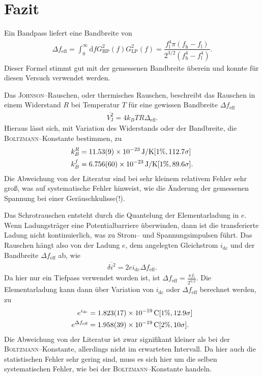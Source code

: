 \documentclass[sn-mathphys-num,iicol]{sn-jnl}
\theoremstyle{thmstyleone}
\theoremstyle{thmstyletwo}
\theoremstyle{thmstylethree}
\newcommand{\td}{\text{d}}
\begin{document}
\section{Fazit}
Ein Bandpass liefert eine Bandbreite von
\begin{align} 
  \Delta f_\text{eff}=\int_{0}^{\infty}\td fG_\text{HP}^2(f)G_\text{LP}^2(f)=\dfrac{f_\text{l}^4\pi \left(f_\text{h}-f_\text{l}\right)}{2^{3/2}\left(f_\text{h}^4-f_\text{l}^4\right)}
.\end{align}
Dieser Formel stimmt gut mit der gemessenen Bandbreite überein und konnte für diesen Versuch verwendet werden.

Das \textsc{Johnson}--Rauschen, oder thermisches Rauschen, beschreibt das Rauschen in einem Widerstand $R$ bei Temperatur $T$ für eine gewissen Bandbreite $\Delta f_\text{eff}$
\begin{align} 
  \overline{V_\text{J}^2}=4k_BTR\Delta _\text{eff}
.\end{align} 
Hieraus lässt sich, mit Variation des Widerstands oder der Bandbreite, die \textsc{Boltzmann}--Konstante bestimmen, zu
\begin{align} 
  k_B^R &= \SI{11.53+-0.09e-23}{J/K}[1\%,112.7\sigma ]\\
  k_B^f &= \SI{6.756+-0.06e-23}{J/K}[1\%,89.6\sigma ]
.\end{align} 
Die Abweichung von der Literatur sind bei sehr kleinem relativem Fehler sehr groß, was auf systematische Fehler hinweist, wie die Änderung der gemessenen Spannung bei einer Geräuschkulisse(!).

Das Schrotrauschen entsteht durch die Quantelung der Elementarladung in $e$.
Wenn Ladungsträger eine Potentialbarriere überwinden, dann ist die transferierte Ladung nicht kontinuierlich, was zu Strom-- und Spannungsimpulsen führt.
Das Rauschen hängt also von der Ladung $e$, dem angelegten Gleichstrom $i_\text{dc}$ und der Bandbreite $\Delta f_\text{eff}$ ab, wie
\begin{align} 
  \overline{\delta i^2}=2ei_\text{dc}\Delta f_\text{eff}
.\end{align} 
Da hier nur ein Tiefpass verwendet worden ist, ist $\Delta f_\text{eff}=\tfrac{\pi f_\text{l}}{2^{3/2}}$.
Die Elementarladung kann dann über Variation von $i_\text{dc}$ oder $\Delta f_\text{eff}$ berechnet werden, zu
\begin{align} 
  e^{i_\text{dc}} &= \SI{1.823+-0.017e-19}{C}[1\%,12.9\sigma ]\\
  e^{\Delta f_\text{eff}} &= \SI{1.958+-0.039e-19}{C}[2\%,10\sigma ]
.\end{align} 
Die Abweichung von der Literatur ist zwar signifikant kleiner als bei der \textsc{Boltzmann}--Konstante, allerdings nicht im erwarteten Intervall.
Da hier auch die statistischen Fehler sehr gering sind, muss es sich hier um die selben systematischen Fehler, wie bei der \textsc{Boltzmann}--Konstante handeln.
\end{document}
